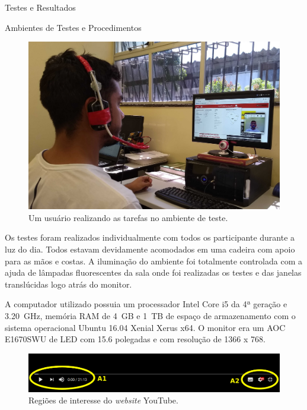 \begin{chapter}{Testes e Resultados}
\begin{section}{Ambientes de Testes e Procedimentos}
\begin{figure}[!h]
	\centering
	\includegraphics[width=1.00\linewidth]{fig/denes}
	\caption{Um usuário realizando as tarefas no ambiente de teste.}
	\label{fig:ambiente}
\end{figure}

Os testes foram realizados individualmente com todos os participante durante a
luz do dia. Todos estavam devidamente acomodados em uma cadeira com apoio para
as mãos e costas. A iluminação do ambiente foi totalmente controlada com a ajuda
de lâmpadas fluorescentes da sala onde foi realizadas os testes e das janelas
translúcidas logo atrás do monitor. 

A computador utilizado possuia um processador Intel Core i5 da 4ª geração e
3.20~GHz, memória RAM de 4~GB e 1~TB de espaço de armazenamento com o sistema
operacional Ubuntu 16.04 Xenial Xerus x64. O monitor era um AOC E1670SWU de LED
com 15.6 polegadas e com resolução de 1366 x 768.

\begin{figure}[!h]
	\centering
	\includegraphics[width=1.00\linewidth]{fig/YT}
	\caption{Regiões de interesse do \textit{website} YouTube.}
	\label{fig:youtube}
\end{figure}


\end{section}
\end{chapter}
